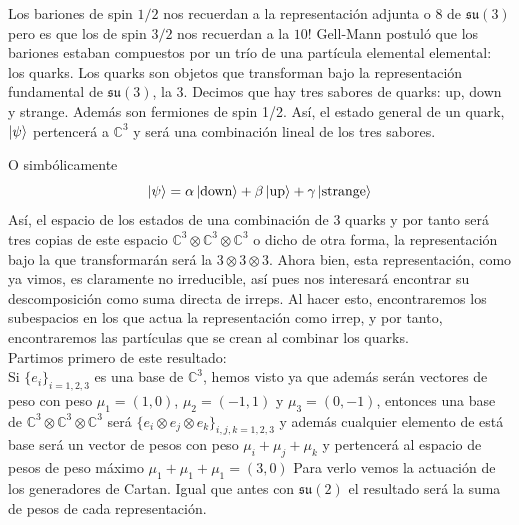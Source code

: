 \documentclass[12pt]{article}
\begin{document}
Los bariones de spin $1/2$ nos recuerdan a la representación adjunta o $8$ de $\mathfrak{s}\mathfrak{u}(3)$ pero es que los de spin $3/2$ nos recuerdan a la $10$! Gell-Mann postuló que los bariones estaban compuestos por un trío de una partícula elemental elemental: los quarks. Los quarks son objetos que transforman bajo la representación fundamental de $\mathfrak{s}\mathfrak{u}(3)$, la $3$.  Decimos que hay tres sabores de quarks: up, down y strange. Además son fermiones de spin 1/2. Así, el estado general de un quark, $\ket{\psi}$ pertencerá a $\mathbb{C}^3$ y será una combinación lineal de los tres sabores.\begin{center}
\end{center}
O simbólicamente 
$$\ket{\psi}=\alpha \ket{\text{down}} +\beta \ket{\text{up}}+\gamma \ket{\text{strange}}$$
Así, el espacio de los estados de una combinación de $3$ quarks y por tanto será tres copias de este espacio $\mathbb{C}^3\otimes \mathbb{C}^3 \otimes \mathbb{C}^3$ o dicho de otra forma, la representación bajo la que transformarán será la $3\otimes 3 \otimes 3$. Ahora bien, esta representación, como ya vimos, es claramente no irreducible, así pues nos interesará encontrar su descomposición como suma directa de irreps. Al hacer esto, encontraremos los subespacios en los que actua la representación como irrep, y por tanto, encontraremos las partículas que se crean al combinar los quarks.\\ Partimos primero de este resultado:\\
Si $\{e_i\}_{i=1,2,3}$ es una base de $\mathbb{C}^3$, hemos visto ya que además serán vectores de peso con peso $\mu_1= (1,0)$, $\mu_2=(-1,1)$ y  $\mu_3=(0,-1)$, entonces una base de $\mathbb{C}^3\otimes \mathbb{C}^3 \otimes \mathbb{C}^3$ será $\{e_i\otimes e_j\otimes e_k\}_{i,j,k=1,2,3}$ y además cualquier elemento de está base será un vector de pesos con peso $\mu_i+\mu_j+\mu_k$ y pertencerá al espacio de pesos de peso máximo $\mu_1+\mu_1+\mu_1=(3,0)$ Para verlo vemos la actuación de los generadores de Cartan. Igual que antes con $\mathfrak{s}\mathfrak{u}(2)$ el resultado será la suma de pesos de cada representación.
\end{document}
